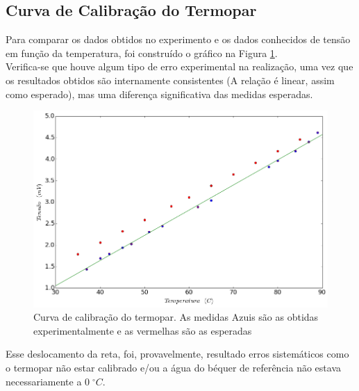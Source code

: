 \documentclass[12pt,a4paper]{article}
\begin{document}
\subsection{Curva de Calibração do Termopar}
Para comparar os dados obtidos no experimento e os dados conhecidos de tensão em função da temperatura, foi construído o gráfico na Figura \ref{termopar}.  \\
Verifica-se que houve algum tipo de erro experimental na realização, uma vez que os resultados obtidos são internamente consistentes (A relação é linear, assim como esperado), mas uma diferença significativa das medidas esperadas.

 
\begin{figure}[!htbp]
\includegraphics[scale=0.55]{termopar.png}
\caption{Curva de calibração do termopar. As medidas Azuis são as obtidas experimentalmente e as vermelhas são as esperadas}
\label{termopar}
\end{figure}

Esse deslocamento da reta, foi, provavelmente, resultado erros sistemáticos como o termopar não estar calibrado e/ou a água do béquer de referência não estava necessariamente a $0 \; ^{\circ} C$.
\end{document}
